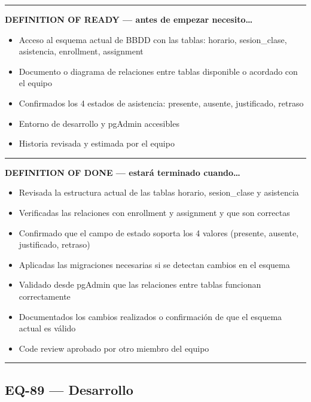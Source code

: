 \documentclass[
  spanish,
  11pt,
]{report}
\providecommand{\tightlist}{%
  \setlength{\itemsep}{0pt}\setlength{\parskip}{0pt}}
\begin{document}
\begin{center}\rule{0.5\linewidth}{0.5pt}\end{center}

\textbf{DEFINITION OF READY --- antes de empezar necesito\ldots{}}

\begin{itemize}
\tightlist
\item
  Acceso al esquema actual de BBDD con las tablas: horario,
  sesion\_clase, asistencia, enrollment, assignment
\item
  Documento o diagrama de relaciones entre tablas disponible o acordado
  con el equipo
\item
  Confirmados los 4 estados de asistencia: presente, ausente,
  justificado, retraso
\item
  Entorno de desarrollo y pgAdmin accesibles
\item
  Historia revisada y estimada por el equipo
\end{itemize}

\begin{center}\rule{0.5\linewidth}{0.5pt}\end{center}

\textbf{DEFINITION OF DONE --- estará terminado cuando\ldots{}}

\begin{itemize}
\tightlist
\item
  Revisada la estructura actual de las tablas horario, sesion\_clase y
  asistencia
\item
  Verificadas las relaciones con enrollment y assignment y que son
  correctas
\item
  Confirmado que el campo de estado soporta los 4 valores (presente,
  ausente, justificado, retraso)
\item
  Aplicadas las migraciones necesarias si se detectan cambios en el
  esquema
\item
  Validado desde pgAdmin que las relaciones entre tablas funcionan
  correctamente
\item
  Documentados los cambios realizados o confirmación de que el esquema
  actual es válido
\item
  Code review aprobado por otro miembro del equipo
\end{itemize}

\begin{center}\rule{0.5\linewidth}{0.5pt}\end{center}

\subsection{EQ-89 --- Desarrollo}\label{eq-89-desarrollo}
\end{document}
